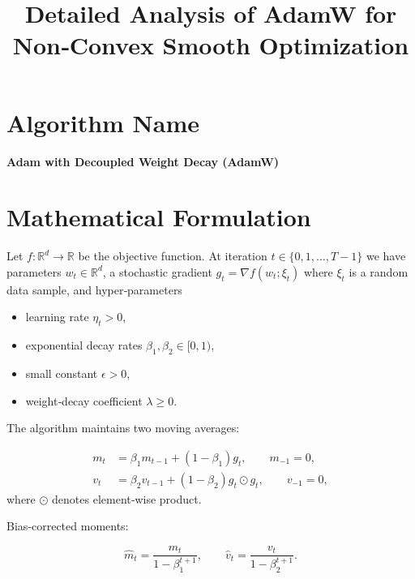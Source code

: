 \documentclass{article}
\begin{document}
\title{Detailed Analysis of AdamW for Non‑Convex Smooth Optimization}
\author{}
\date{}
\maketitle

\tableofcontents
\newpage

\section*{Algorithm Name}
\begin{center}
\textbf{Adam with Decoupled Weight Decay (AdamW)}
\end{center}

\section*{Mathematical Formulation}
Let $f:\mathbb{R}^{d}\rightarrow\mathbb{R}$ be the objective function.  
At iteration $t\in\{0,1,\dots,T-1\}$ we have parameters $w_t\in\mathbb{R}^{d}$, a stochastic gradient 
$g_t=\nabla f(w_t;\xi_t)$ where $\xi_t$ is a random data sample, and hyper‑parameters

\begin{itemize}[noitemsep]
\item learning rate $\eta_t>0$,
\item exponential decay rates $\beta_1,\beta_2\in[0,1)$,
\item small constant $\epsilon>0$,
\item weight‑decay coefficient $\lambda\ge 0$.
\end{itemize}

The algorithm maintains two moving averages:

\[
\begin{aligned}
m_t &= \beta_1 m_{t-1} + (1-\beta_1) g_t, \qquad m_{-1}=0,\\[4pt]
v_t &= \beta_2 v_{t-1} + (1-\beta_2) g_t\odot g_t,\qquad v_{-1}=0,
\end{aligned}
\]
where $\odot$ denotes element‑wise product.

Bias‑corrected moments:

\[
\hat m_t = \frac{m_t}{1-\beta_1^{t+1}},\qquad
\hat v_t = \frac{v_t}{1-\beta_2^{t+1}}.
\]
\end{document}
